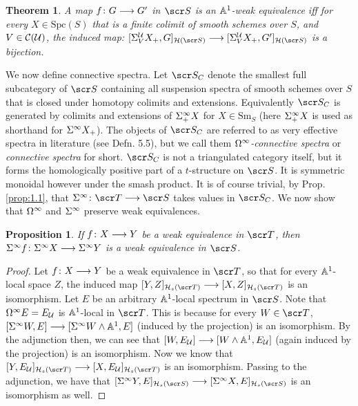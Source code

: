 \documentclass{amsart}
\newtheorem{thm}{Theorem}[section]
\newtheorem{prop}{Proposition}[section]
\theoremstyle{definition}
\begin{document}
\begin{thm}\label{thm:2.2}
A map $f \colon G \longrightarrow G'$ in $\sS$ is an $\mathbb{A}^1$-weak equivalence iff for every $X \in \mathrm{Spc}(S)$ that is a finite colimit of smooth schemes over $S$, and $V \in {\mathcal{C}}({\mathcal{U}})$, the induced map: $[\SI^{\oU}_V X_+, G]_{\oH(\sS)} \rtarr [\SI^{\oU}_V X_+, G']_{\oH(\sS)}$ is a bijection.
\end{thm}

We now define connective spectra. Let $\sS_C$ denote the smallest full subcategory of $\sS$ containing all suspension spectra of smooth schemes over $S$ that is closed under homotopy colimits and extensions. Equivalently $\sS_C$ is generated by colimits and extensions of $\Sigma^{\infty}_+ X$ for $X \in \mathrm{Sm}_S$ (here $\Sigma^{\infty}_+ X$ is used as shorthand for $\Sigma^{\infty}X_+$). The objects of $\sS_C$ are referred to as very effective spectra in literature (see \cite{SO12veff} Defn. 5.5), but we call them \emph{$\Omega^{\infty}$-connective spectra} or \emph{connective spectra} for short. $\sS_C$ is not a triangulated category itself, but it forms the homologically positive part of a $t$-structure on $\sS$. It is symmetric monoidal however under the smash product. It is of course trivial, by Prop. \ref{prop:1.1}, that $\SI^{\infty} \colon \sT \rtarr \sS$ takes values in $\sS_C$. We now show that $\Omega^{\infty}$ and $\Sigma^{\infty}$ preserve weak equivalences.

\begin{prop}
If $f \colon X \longrightarrow Y$ be a weak equivalence in $\sT$, then $\Sigma^{\infty}f \colon \Sigma^{\infty} X \longrightarrow \Sigma^{\infty} Y$ is a weak equivalence in $\sS$.
\end{prop}
\begin{proof}
Let $f \colon X \longrightarrow Y$ be a weak equivalence in $\sT$, so that for every $\mathbb{A}^1$-local space $Z$, the induced map $[Y,Z]_{\oH_s(\sT)} \rtarr [X,Z]_{\oH_s(\sT)}$ is an isomorphism. Let $E$ be an arbitrary $\mathbb{A}^1$-local spectrum in $\sS$. Note that $\Omega^{\infty}E = E_{{\mathcal{U}}}$ is $\mathbb{A}^1$-local in $\sT$. This is because for every $W \in \sT$, $[\Sigma^{\infty}W,E] \longrightarrow [\Sigma^{\infty}W \wedge \mathbb{A}^1, E]$ (induced by the projection) is an isomorphism. By the adjunction then, we can see that $[W,E_{{\mathcal{U}}}] \longrightarrow [W \wedge \mathbb{A}^1, E_{{\mathcal{U}}}]$ (again induced by the projection) is an isomorphism. Now we know that $[Y,E_{\oU}]_{\oH_s(\sT)} \rtarr [X,E_{\oU}]_{\oH_s(\sT)}$ is an isomorphism. Passing to the adjunction, we have that $[\SI^{\infty}Y,E]_{\oH_s(\sS)} \rtarr [\SI^{\infty}X,E]_{\oH_s(\sS)}$ is an isomorphism as well. 
\end{proof}
\end{document}
